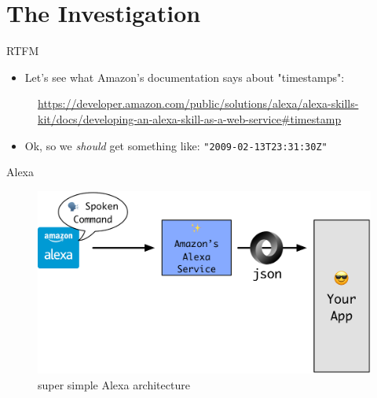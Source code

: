 \documentclass[10pt]{beamer}
\begin{document}
\section{The Investigation}
\begin{frame}{RTFM}
		\begin{itemize}
			\item Let's see what Amazon's documentation says about "timestamps":
		\end{itemize}
			\begin{figure}
				\centering
				\caption{\url{https://developer.amazon.com/public/solutions/alexa/alexa-skills-kit/docs/developing-an-alexa-skill-as-a-web-service\#timestamp}}
			\end{figure}
		\begin{itemize}
			\item Ok, so we \textit{should} get something like: \texttt{"2009-02-13T23:31:30Z"}
	\end{itemize}
\end{frame}

\begin{frame}{Alexa}
\begin{center}
	\begin{figure}
		\centering
		\includegraphics[width=\textwidth]{./images/alexa-flow-01.png}
		\caption{super simple Alexa architecture}
	\end{figure}
\end{center}
\end{frame}
\end{document}
